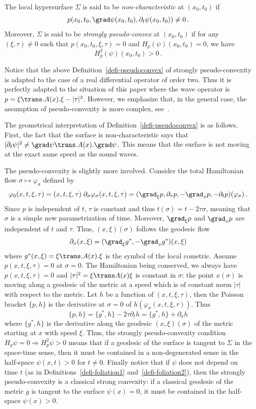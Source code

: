\begin{defi}\label{defi-pseudoconvex}
The local hypersurface $\Sigma$ is said to be \emph{non-characteristic} at $(x_0,t_0)$ if
\[
p(x_0,t_0,\grad \psi(x_0,t_0),\partial_t \psi(x_0,t_0))\neq 0\,.
\]
Moreover, $\Sigma$ is said to be \emph{strongly pseudo-convex} at $(x_0,t_0)$ if for any $(\xi,\tau)\neq 0$ such that $p(x_0,t_0,\xi,\tau)=0$ and $H_p(\psi)(x_0,t_0)=0$, we have
\[
H_p^2(\psi)(x_0,t_0)>0\,.
\]
\end{defi}

Notice that the above Definition~\ref{defi-pseudoconvex} of strongly pseudo-convexity is adapted to the case of a real differential operator of order two. Thus it is perfectly adapted to the situation of this paper where the wave operator is $p=\xi\trans.A(x).\xi-|\tau|^2$. However, we emphasize that, in the general case, the assumption of pseudo-convexity is more complex, see~\cite{Hormander}.

The geometrical interpretation of Definition~\ref{defi-pseudoconvex} is as follows. First, the fact that the surface is non-characteristic says that $|\partial_t \psi|^2 \neq \grad\psi\trans.A(x).\grad \psi$. This means that the surface is not moving at the exact same speed as the sound waves.

The pseudo-convexity is slightly more involved. Consider the total Hamiltonian flow $\sigma\mapsto\varphi_\sigma$ defined by
\[
\varphi_0(x,t,\xi,\tau)=(x,t,\xi,\tau)\;\partial_\sigma
\varphi_\sigma(x,t,\xi,\tau)=(\grad_\xi p,\partial_\tau
p,-\grad_x p,-\partial_t p)(\varphi_\sigma)\,.
\]
Since $p$ is independent of $t$, $\tau$ is constant and thus $t(\sigma)=t-2\tau\sigma$, meaning that $\sigma$ is a simple new parametrization of time. Moreover, $\grad_\xi p$ and $\grad_x p$ are independent of $t$ and $\tau$. Thus, $(x,\xi)(\sigma)$ follows the geodesic flow
\[
\partial_\sigma (x,\xi)=(\grad_\xi g^*,-\grad_x g^*)(x,\xi)
\]
where $g^{*}(x,\xi)=\xi\trans.A(x).\xi$ is the symbol of the local cometric. Assume $p(x,t,\xi,\tau)=0$ at $\sigma=0$. The Hamiltonian being conserved, we always have $p(x,t,\xi,\tau)=0$ and $|\tau|^2=\xi\trans A(x)\xi$ is constant in $\sigma$: the point $x(\sigma)$ is moving along a geodesic of the metric at a speed which is of constant norm $|\tau|$ with respect to the metric. Let $h$ be a function of $(x,t,\xi,\tau)$, then the Poisson bracket $\{p,h\}$ is the derivative at $\sigma=0$ of $h(\varphi_\sigma(x,t,\xi,\tau))$. Thus
\[
\{p,h\}=\{g^*,h\} -2\tau \partial_t h=\{g^*,h\} + \partial_\sigma h
\]
where $\{g^*,h\}$ is the derivative along the geodesic $(x,\xi)(\sigma)$ of the metric starting at $x$ with speed $\xi$. Thus, the strongly pseudo-convexity condition $H_p\psi=0\Rightarrow H_p^2 \psi>0$ means that if a geodesic of the surface is tangent to $\Sigma$ in the space-time sense, then it must be contained in a non-degenerated sense in the half-space $\psi(x,t)>0$ for $t\neq0$. Finally notice that if $\psi$ does not depend on time $t$ (as in Definitions~\ref{defi-foliation1} and~\ref{defi-foliation2}), then the strongly pseudo-convexity is a classical strong convexity: if a classical geodesic of the metric $g$ is tangent to the surface $\psi(x)=0$, it must be contained in the half-space $\psi(x)>0$.

